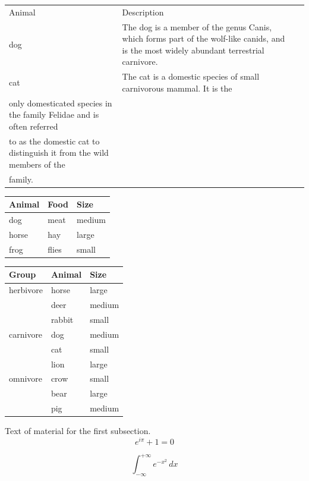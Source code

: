 \documentclass[a4paper,12pt]{book} %
\begin{document}
\begin{tabular}{lll}
Animal & Description \\
dog    & The dog is a member of the genus Canis, which forms part of the
    wolf-like canids, and is the most widely abundant terrestrial
   carnivore. \\
cat    & The cat is a domestic species of small carnivorous mammal. It is the
\\
    only domesticated species in the family Felidae and is often referred
\\   
 to as the domestic cat to distinguish it from the wild members of the
\\ 
   family. \\
\end{tabular}


\begin{tabular}{lll}
\toprule
Animal & Food  & Size   \\
\midrule
dog    & meat  & medium \\
\cmidrule{1-2}
horse  & hay   & large  \\
\cmidrule{1-1}
\cmidrule{3-3}
frog   & flies & small  \\
\bottomrule
\end{tabular}

\begin{tabular}{lll}
\toprule
Group     & Animal & Size   \\
\midrule
herbivore & horse  & large  \\
     & deer   & medium \\
     & rabbit & small  \\
\addlinespace
carnivore & dog    & medium \\
     & cat    & small  \\
     & lion   & large  \\
\addlinespace
omnivore  & crow   & small  \\
     & bear   & large  \\
     & pig    & medium \\
\bottomrule
\end{tabular}

Text of material for the first subsection.
\begin{equation}
e^{i\pi}+1 = 0
\label{eq:labeltwo}
\end{equation}

\begin{equation}
\int_{-\infty}^{+\infty} e^{-x^2} \, dx
\end{equation}
\end{document}
